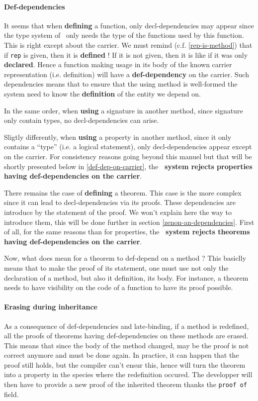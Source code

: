 \paragraph{Def-dependencies}
\label{def-dependency}
It seems that when {\bf defining} a function, only decl-dependencies
may appear since the type system of \focal\ only needs the type of the
functions used by this function. This is right except about the
carrier. We must remind (c.f. \ref{rep-is-method}) that if {\tt rep}
is given, then it is {\bf defined} ! If it is not given, then it is
like if it was only {\bf declared}. Hence a function making usage
in its body of the known carrier representation (i.e. definition) will
have a {\bf def-dependency} on the carrier. Such dependencies means
that to ensure that the using method is well-formed the system need to
know the {\bf definition} of the entity we depend on.


\smallskip
In the same order, when {\bf using} a signature in another method,
since signature only contain types, no decl-dependencies can arise.

\smallskip
{}
Sligtly differently, when {\bf using} a property in another method,
since it only contains a ``type'' (i.e. a logical statement), only 
decl-dependencies appear except on the carrier. For consistency
reasons going beyond this manuel but that will be shortly presented
below in \ref{def-dep-on-carrier}, the {\bf \focal\ system rejects
properties having def-dependencies on the carrier}.

\smallskip
There remains the case of {\bf defining} a theorem. This case is the
more complex since it can lead to decl-dependencies via its
proofs. These dependencies are introduce by the statement of the
proof. We won't explain here the way to introduce them, this will be
done further in section \ref{zenon-an-dependencies}. First of all, for
the same reasons than for properties, the {\bf \focal\ system rejects
theorems having def-dependencies on the carrier}.

Now, what does mean for a theorem to def-depend on a method ? This
basiclly means that to make the proof of its statement, one must use
not only the declaration of a method, but also it definition, its
body. For instance, a theorem needs to have visibility on the code of
a function to have its proof possible.



\paragraph{Erasing during inheritance}
\label{erasing}
As a consequence of def-dependencies and late-binding, if a method is
redefined, all the proofs of theorems having def-dependencies on these
methods are erased. This means that since the body of the method
changed, may be the proof is not correct anymore and must be done
again. In practice, it can happen that the proof still holds, but the
compiler can't ensur this, hence will turn the theorem into a property
in the species where the redefinition occured. The developper will
then have to provide a new proof of the inherited theorem thanks the
{\tt proof of} field.



